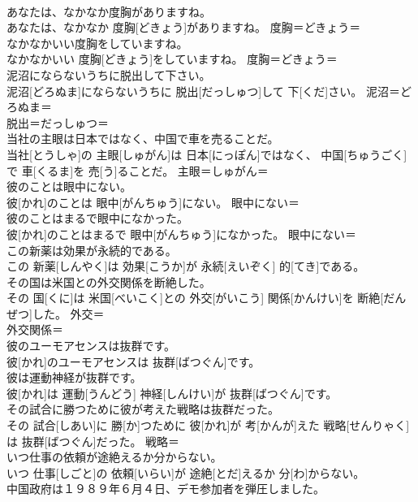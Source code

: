 \documentclass[8pt]{extreport}
\begin{document}
\begin{CJK}{UTF8}{min}
\\	あなたは、なかなか度胸がありますね。	
\\	あなたは、なかなか 度胸[どきょう]がありますね。	度胸＝どきょう＝ 
\\	なかなかいい度胸をしていますね。	
\\	なかなかいい 度胸[どきょう]をしていますね。	度胸＝どきょう＝ 
\\	泥沼にならないうちに脱出して下さい。	
\\	泥沼[どろぬま]にならないうちに 脱出[だっしゅつ]して 下[くだ]さい。	泥沼＝どろぬま＝ 
\\	脱出＝だっしゅつ＝ 
\\	当社の主眼は日本ではなく、中国で車を売ることだ。	
\\	当社[とうしゃ]の 主眼[しゅがん]は 日本[にっぽん]ではなく、 中国[ちゅうごく]で 車[くるま]を 売[う]ることだ。	主眼＝しゅがん＝ 
\\	彼のことは眼中にない。	
\\	彼[かれ]のことは 眼中[がんちゅう]にない。	眼中にない＝ 
\\	彼のことはまるで眼中になかった。	
\\	彼[かれ]のことはまるで 眼中[がんちゅう]になかった。	眼中にない＝ 
\\	この新薬は効果が永続的である。	
\\	この 新薬[しんやく]は 効果[こうか]が 永続[えいぞく] 的[てき]である。	
\\	その国は米国との外交関係を断絶した。	
\\	その 国[くに]は 米国[べいこく]との 外交[がいこう] 関係[かんけい]を 断絶[だんぜつ]した。	外交＝ 
\\	外交関係＝ 
\\	彼のユーモアセンスは抜群です。	
\\	彼[かれ]のユーモアセンスは 抜群[ばつぐん]です。	
\\	彼は運動神経が抜群です。	
\\	彼[かれ]は 運動[うんどう] 神経[しんけい]が 抜群[ばつぐん]です。	
\\	その試合に勝つために彼が考えた戦略は抜群だった。	
\\	その 試合[しあい]に 勝[か]つために 彼[かれ]が 考[かんが]えた 戦略[せんりゃく]は 抜群[ばつぐん]だった。	戦略＝ 
\\	いつ仕事の依頼が途絶えるか分からない。	
\\	いつ 仕事[しごと]の 依頼[いらい]が 途絶[とだ]えるか 分[わ]からない。	
\\	中国政府は１９８９年６月４日、デモ参加者を弾圧しました。	

\end{CJK}
\end{document}
